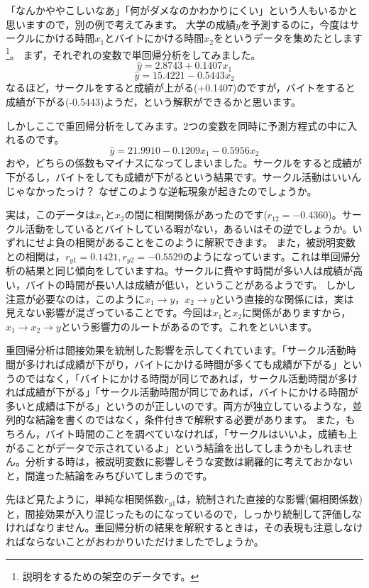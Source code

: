 \documentclass{ltjbook}
\begin{document}
「なんかややこしいなあ」「何がダメなのかわかりにくい」という人もいるかと思いますので，別の例で考えてみます。
大学の成績$y$を予測するのに，今度はサークルにかける時間$x_1$とバイトにかける時間$x_2$をというデータを集めたとします\footnote{説明をするための架空のデータです。}。
まず，それぞれの変数で単回帰分析をしてみました。
\[ \hat{y} = 2.8743 + 0.1407 x_1 \]
\[ \hat{y} = 15.4221 -0.5443 x_2 \]
なるほど，サークルをすると成績が上がる(+0.1407)のですが，バイトをすると成績が下がる(-0.5443)ようだ，という解釈ができるかと思います。

しかしここで重回帰分析をしてみます。2つの変数を同時に予測方程式の中に入れるのです。
\[\hat{y} = 21.9910 -0.1209 x_1 - 0.5956x_2\]
おや，どちらの係数もマイナスになってしまいました。サークルをすると成績が下がるし，バイトをしても成績が下がるという結果です。サークル活動はいいんじゃなかったっけ？ なぜこのような逆転現象が起きたのでしょうか。

実は，このデータは$x_1$と$x_2$の間に相関関係があったのです($r_{12}=-0.4360$)。サークル活動をしているとバイトしている暇がない，あるいはその逆でしょうか。いずれにせよ負の相関があることをこのように解釈できます。
また，被説明変数との相関は，$r_{y1}=0.1421,r_{y2}=-0.5529$のようになっています。これは単回帰分析の結果と同じ傾向をしていますね。サークルに費やす時間が多い人は成績が高い，バイトの時間が長い人は成績が低い，ということがあるようです。
しかし注意が必要なのは，このように$x_1 \to y$，$x_2 \to y$という直接的な関係には，実は見えない影響が混ざっていることです。今回は$x_1$と$x_2$に関係がありますから，$x_1 \to x_2 \to y$という影響力のルートがあるのです。これをといいます。

重回帰分析は間接効果を統制した影響を示してくれています。「サークル活動時間が多ければ成績が下がり，バイトにかける時間が多くても成績が下がる」というのではなく，「バイトにかける時間が同じであれば，サークル活動時間が多ければ成績が下がる」「サークル活動時間が同じであれば，バイトにかける時間が多いと成績は下がる」というのが正しいのです。両方が独立しているような，並列的な結論を書くのではなく，条件付きで解釈する必要があります。
また，もちろん，バイト時間のことを調べていなければ，「サークルはいいよ，成績も上がることがデータで示されているよ」という結論を出してしまうかもしれません。分析する時は，被説明変数に影響しそうな変数は網羅的に考えておかないと，間違った結論をみちびいてしまうのです。

先ほど見たように，単純な相関係数$r_{y1}$は，統制された直接的な影響(偏相関係数)と，間接効果が入り混じったものになっているので，しっかり統制して評価しなければなりません。重回帰分析の結果を解釈するときは，その表現も注意しなければならないことがおわかりいただけましたでしょうか。
\end{document}
